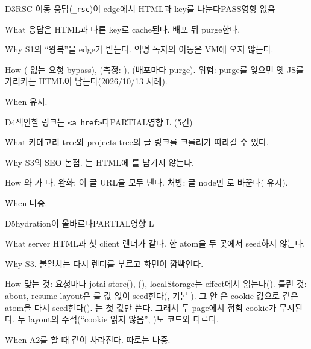 \begin{checkitem}{\ckdone}{D3}{RSC 이동 응답(\texttt{\_rsc})이 edge에서 HTML과 key를 나눈다}{PASS\ckdot{}영향 없음}
  \item[What]  응답은 HTML과 다른 key로 cache된다. 배포 뒤 purge한다.
  \item[Why] S1의 ``왕복''을 edge가 받는다. 익명 독자의 이동은 VM에 오지 않는다.
  \item[How] ( 없는  요청 bypass), (측정:   ), (배포마다 purge). 위험: purge를 잊으면 옛 JS를 가리키는 HTML이 남는다(2026/10/13 사례).
  \item[When] 유지.
\end{checkitem}

\begin{checkitem}{\ckopen}{D4}{색인할 링크는 \texttt{<a href>}다}{PARTIAL\ckdot{}영향 L (5건)}
  \item[What] 카테고리 tree와 projects tree의 글 링크를 크롤러가 따라갈 수 있다.
  \item[Why] S3의 SEO 논점. 는 HTML에 를 남기지 않는다.
  \item[How] 와 가 다. 완화: 이 글 URL을 모두 낸다. 처방: 글 node만 로 바꾼다( 유지).
  \item[When] 나중.
\end{checkitem}

\begin{checkitem}{\ckopen}{D5}{hydration이 올바르다}{PARTIAL\ckdot{}영향 L}
  \item[What] server HTML과 첫 client 렌더가 같다. 한 atom을 두 곳에서 seed하지 않는다.
  \item[Why] S3. 불일치는 다시 렌더를 부르고 화면이 깜빡인다.
  \item[How] 맞는 것: 요청마다 jotai store(), (), localStorage는 effect에서 읽는다(). 틀린 것: about, resume layout은 를 값 없이 seed한다(, 기본 ). 그 안 은 cookie 값으로 같은 atom을 다시 seed한다(). 는 첫 값만 쓴다. 그래서 두 page에서 접힘 cookie가 무시된다. 두 layout의 주석(``cookie 읽지 않음'', )도 코드와 다르다.
  \item[When] A2를 할 때 같이 사라진다. 따로는 나중.
\end{checkitem}

